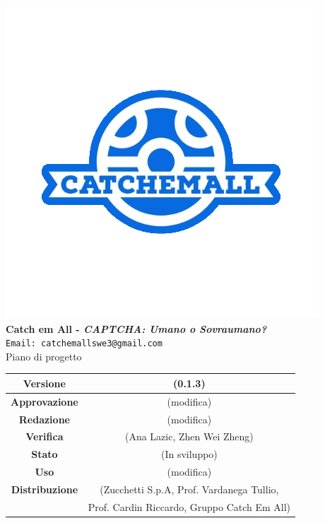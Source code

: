 \begin{titlepage}
\begin{center}
	\includegraphics[scale = 1.5]{img/logo.png}\\
	\bigskip
	\large \textbf{Catch em All - \textit{CAPTCHA: Umano o Sovraumano?}}\\
	\texttt{Email: catchemallswe3@gmail.com}\\
	\vfill
	{\fontsize{1.5cm}{0}\selectfont Piano di progetto}\\
	\vfill
	\begin{tabularx}{\textwidth}{|c|c|}
		\hline
		\textbf{Versione} & (0.1.3)\\
		\hline
		\textbf{Approvazione} & (modifica)\\
		\hline
		\textbf{Redazione} & (modifica)\\
		\hline
		\textbf{Verifica} & (Ana Lazic, Zhen Wei Zheng)\\
		\hline
		\textbf{Stato} & (In sviluppo)\\
		\hline
		\textbf{Uso} & (modifica)\\
		\hline
		\textbf{Distribuzione} & (Zucchetti S.p.A, Prof. Vardanega Tullio, \\
		&  Prof. Cardin Riccardo, Gruppo Catch Em All)\\
		\hline
	\end{tabularx}
\end{center}
\end{titlepage}
